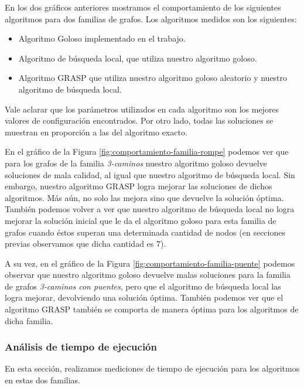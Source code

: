 En los dos gráficos anteriores mostramos el comportamiento de los siguientes algoritmos para dos familias de grafos. Los algoritmos medidos son los siguientes:

\begin{itemize}
 \item Algoritmo Goloso implementado en el trabajo.
 \item Algoritmo de búsqueda local, que utiliza nuestro algoritmo goloso.
 \item Algoritmo GRASP que utiliza nuestro algoritmo goloso aleatorio y nuestro algoritmo de búsqueda local.
\end{itemize}

Vale aclarar que los parámetros utilizados en cada algoritmo son los mejores valores de configuración encontrados. Por otro lado, todas las soluciones se muestran en proporción a las del algoritmo exacto.

En el gráfico de la Figura \ref{fig:comportamiento-familia-rompe} podemos ver que para los grafos de la familia \emph{3-caminos} nuestro algoritmo goloso devuelve soluciones de mala calidad, al igual que nuestro algoritmo de búsqueda local. Sin embargo, nuestro algoritmo GRASP logra mejorar las soluciones de dichos algoritmos. Más aún, no solo las mejora sino que devuelve la solución óptima. También podemos volver a ver que nuestro algoritmo de búsqueda local no logra mejorar la solución inicial que le da el algoritmo goloso para esta familia de grafos cuando éstos superan una determinada cantidad de nodos (en secciones previas observamos que dicha cantidad es $7$).

A su vez, en el gráfico de la Figura \ref{fig:comportamiento-familia-puente} podemos observar que nuestro algoritmo goloso devuelve malas soluciones para la familia de grafos \emph{3-caminos con puentes}, pero que el algoritmo de búsqueda local las logra mejorar, devolviendo una solución óptima. También podemos ver que el algoritmo GRASP también se comporta de manera óptima para los algoritmos de dicha familia.

\subsubsection{Análisis de tiempo de ejecución}

En esta sección, realizamos mediciones de tiempo de ejecución para los algoritmos en estas dos familias.

